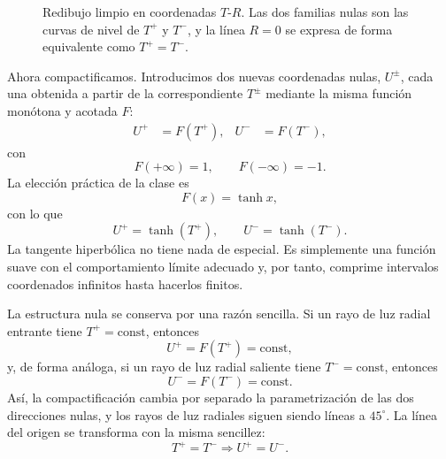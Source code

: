 \begin{figure}[htbp]
\centering
{}
\caption{Redibujo limpio en coordenadas \(T\)-\(R\). Las dos familias nulas son las curvas de nivel de \(T^+\) y \(T^-\), y la línea \(R=0\) se expresa de forma equivalente como \(T^+=T^-\).}
\end{figure}

Ahora compactificamos. Introducimos dos nuevas coordenadas nulas, \(U^\pm\), cada una obtenida a partir de la correspondiente \(T^\pm\) mediante la misma función monótona y acotada \(F\):
\begin{align}
U^+ &= F(T^+), &
U^- &= F(T^-),
\end{align}
con
\begin{equation}
F(+\infty)=1,
\qquad
F(-\infty)=-1.
\end{equation}
La elección práctica de la clase es
\begin{equation}
F(x)=\tanh x,
\end{equation}
con lo que
\begin{equation}
U^+ = \tanh(T^+),
\qquad
U^- = \tanh(T^-).
\end{equation}
La tangente hiperbólica no tiene nada de especial. Es simplemente una función suave con el comportamiento límite adecuado y, por tanto, comprime intervalos coordenados infinitos hasta hacerlos finitos.

La estructura nula se conserva por una razón sencilla. Si un rayo de luz radial entrante tiene \(T^+=\text{const}\), entonces
\[
U^+=F(T^+)=\text{const},
\]
y, de forma análoga, si un rayo de luz radial saliente tiene \(T^-=\text{const}\), entonces
\[
U^-=F(T^-)=\text{const}.
\]
Así, la compactificación cambia por separado la parametrización de las dos direcciones nulas, y los rayos de luz radiales siguen siendo líneas a \(45^\circ\). La línea del origen se transforma con la misma sencillez:
\[
T^+=T^- \Longrightarrow U^+=U^-.
\]


